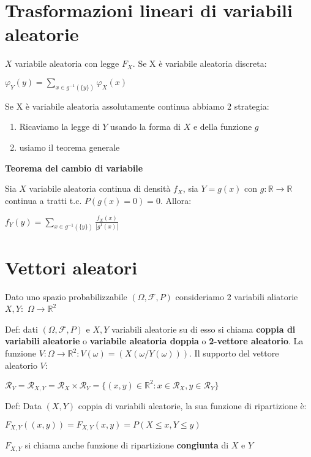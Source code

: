 \documentclass[12pt, a4paper]{article}
\begin{document}
\newpage
\section{Trasformazioni lineari di variabili aleatorie}

$X$ variabile aleatoria con legge $F_{X}$. Se X è variabile aleatoria discreta:
\begin{center}
    $\varphi_{Y}(y)=\sum_{x\in g^{-1}(\{y\})}\varphi_{X}(x)$
\end{center}
Se X è variabile aleatoria assolutamente continua abbiamo 2 strategia:
\begin{enumerate}
    \item Ricaviamo la legge di $Y$ usando la forma di $X$ e della funzione $g$
    \item usiamo il teorema generale
\end{enumerate}

\textbf{Teorema del cambio di variabile}

Sia $X$ variabile aleatoria continua di densità $f_{X}$, sia $Y=g(x)$ con $g:\mathbb{R}\rightarrow\mathbb{R}$
continua a tratti t.c. $P(g(x)=0)=0$. Allora:
\begin{center}
    $f_{Y}(y)=\sum_{x\in g^{-1}(\{y\})}\frac{f_{X}(x)}{|g^{1}(x)|} $
\end{center}

\section{Vettori aleatori}
Dato uno spazio probabilizzabile $(\Omega,\mathcal{F},P)$ consideriamo 2 variabili aliatorie $X,Y: $
$\Omega\rightarrow$$\mathbb{R}^{2}$

Def: dati $(\Omega,\mathcal{F},P)$ e $X,Y$ variabili aleatorie su di esso si chiama \textbf{coppia di variabili aleatorie}
o \textbf{variabile aleatoria doppia} o \textbf{2-vettore aleatorio}. La funzione $V:\Omega\rightarrow\mathbb{R}^{2}:
V(\omega)=(X(\omega/Y(\omega)))$. Il supporto del vettore aleatorio $V$:
\begin{center}
    $\mathcal{R}_{V}=\mathcal{R}_{X,Y}=\mathcal{R}_{X}\times\mathcal{R}_{Y}=\{(x,y)\in\mathbb{R}^{2}:x\in\mathcal{R}_{X}
    , y\in\mathcal{R}_{Y} \}$
\end{center}
Def: Data $(X,Y)$ coppia di variabili aleatorie, la sua funzione di ripartizione è:
\begin{center}
    $F_{X,Y}((x,y))=F_{X,Y}(x,y)=P(X\leq x, Y\leq y)$
\end{center}
$F_{X,Y}$ si chiama anche funzione di ripartizione \textbf{congiunta} di $X$ e $Y$
\end{document}
